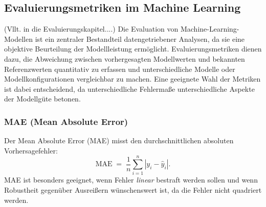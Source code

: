 





\subsection{Evaluierungsmetriken im Machine Learning}(Vllt. in die Evaluierungskapitel....)
Die Evaluation von Machine-Learning-Modellen ist ein zentraler Bestandteil datengetriebener Analysen, da sie eine objektive Beurteilung der Modellleistung ermöglicht. Evaluierungsmetriken dienen dazu, die Abweichung zwischen vorhergesagten Modellwerten und bekannten Referenzwerten quantitativ zu erfassen und unterschiedliche Modelle oder Modellkonfigurationen vergleichbar zu machen. Eine geeignete Wahl der Metriken ist dabei entscheidend, da unterschiedliche Fehlermaße unterschiedliche Aspekte der Modellgüte betonen.

\subsubsection{MAE (Mean Absolute Error)}
Der Mean Absolute Error (MAE) misst den durchschnittlichen absoluten Vorhersagefehler:
\begin{equation}
	\mathrm{MAE} \;=\; \frac{1}{n}\sum_{i=1}^{n}\left|y_i-\hat{y}_i\right|.
\end{equation}
MAE ist besonders geeignet, wenn Fehler \emph{linear} bestraft werden sollen und wenn Robustheit gegenüber Ausreißern wünschenswert ist, da die Fehler nicht quadriert werden. \cite{willmott2005advantages}
